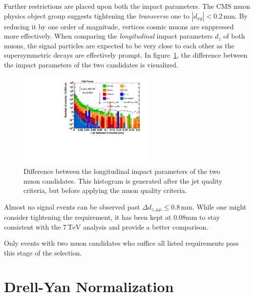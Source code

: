 Further restrictions are placed upon both the impact parameters. The CMS muon physics object group suggests tightening the \textit{transverse} one to $|d_{xy}| < 0.2\,\text{mm}$. By reducing it by one order of magnitude, vertices cosmic muons are suppressed more effectively. When comparing the \textit{longitudinal} impact parameters $d_z$ of both muons, the signal particles are expected to be very close to each other as the supersymmetric decays are effectively prompt. In figure~\ref{fig:deltadz}, the difference between the impact parameters of the two candidates is visualized.

\begin{figure}[ht!]
  \centering
    \includegraphics[width=0.6\textwidth]{plots/dz_mumu.pdf}
  \caption{Difference between the longitudinal impact parameters of the two muon candidates. This histogram is generated after the jet quality criteria, but before applying the muon quality criteria.}
  \label{fig:deltadz}
\end{figure}

\noindent Almost no signal events can be observed past $\Delta d_{z, \mu\mu} \leq 0.8\,\text{mm}$. While one might consider tightening the requirement, it has been kept at $0.08\text{mm}$ to stay consistent with the $7\,\text{TeV}$ analysis and provide a better comparison.

Only events with two muon candidates who suffice all listed requirements pass this stage of the selection.



\section{Drell-Yan Normalization}
\label{sec:scaling}

